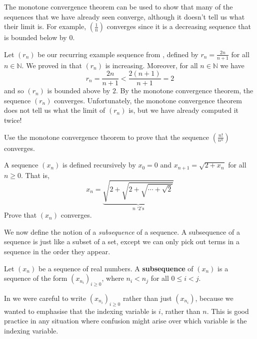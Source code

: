 \begin{example}
The monotone convergence theorem can be used to show that many of the sequences that we have already seen converge, although it doesn't tell us what their limit is. For example, $\left( \frac{1}{n} \right)$ converges since it is a decreasing sequence that is bounded below by $0$.
\end{example}

\begin{example}
\label{exTwoNOverNPlusOneConvergenceYetAgain}
Let $(r_n)$ be our recurring example sequence from , defined by $r_n = \frac{2n}{n+1}$ for all $n \in \mathbb{N}$. We proved in  that $(r_n)$ is increasing. Moreover, for all $n \in \mathbb{N}$ we have
\[ r_n = \frac{2n}{n+1} < \frac{2(n+1)}{n+1} = 2 \]
and so $(r_n)$ is bounded above by $2$. By the monotone convergence theorem, the sequence $(r_n)$ converges. Unfortunately, the monotone convergence theorem does not tell us what the limit of $(r_n)$ is, but we have already computed it twice!
\end{example}

\begin{exercise}
Use the monotone convergence theorem to prove that the sequence $\left( \frac{n!}{n^n} \right)$ converges.
\end{exercise}

\begin{exercise}
A sequence $(x_n)$ is defined recursively by $x_0 = 0$ and $x_{n+1} = \sqrt{2+x_n}$ for all $n \ge 0$. That is,
\[ x_n = \underbrace{\sqrt{2 + \sqrt{2 + \sqrt{ \cdots + \sqrt{2}}}}}_{n \text{ `2's}} \]
Prove that $(x_n)$ converges.
\end{exercise}

We now define the notion of a \textit{subsequence} of a sequence. A subsequence of a sequence is just like a subset of a set, except we can only pick out terms in a sequence in the order they appear.

\begin{definition}
\label{defSubsequence}
Let $(x_n)$ be a sequence of real numbers. A \textbf{subsequence} of $(x_n)$ is a sequence of the form $(x_{n_i})_{i \ge 0}$, where $n_i < n_j$ for all $0 \le i < j$.
\end{definition}

In  we were careful to write $(x_{n_i})_{i \ge 0}$ rather than just $(x_{n_i})$, because we wanted to emphasise that the indexing variable is $i$, rather than $n$. This is good practice in any situation where confusion might arise over which variable is the indexing variable.

